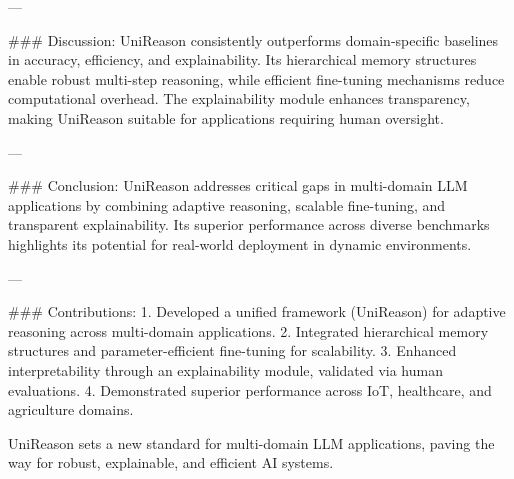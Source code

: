 ---

### Discussion:
UniReason consistently outperforms domain-specific baselines in accuracy, efficiency, and explainability. Its hierarchical memory structures enable robust multi-step reasoning, while efficient fine-tuning mechanisms reduce computational overhead. The explainability module enhances transparency, making UniReason suitable for applications requiring human oversight.

---

### Conclusion:
UniReason addresses critical gaps in multi-domain LLM applications by combining adaptive reasoning, scalable fine-tuning, and transparent explainability. Its superior performance across diverse benchmarks highlights its potential for real-world deployment in dynamic environments.

---

### Contributions:
1. Developed a unified framework (UniReason) for adaptive reasoning across multi-domain applications.
2. Integrated hierarchical memory structures and parameter-efficient fine-tuning for scalability.
3. Enhanced interpretability through an explainability module, validated via human evaluations.
4. Demonstrated superior performance across IoT, healthcare, and agriculture domains.

UniReason sets a new standard for multi-domain LLM applications, paving the way for robust, explainable, and efficient AI systems.